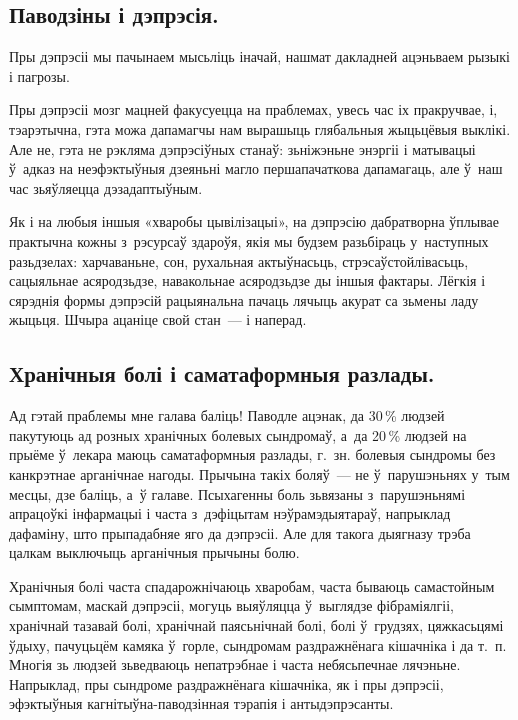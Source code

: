 \subsection*{Паводзіны і дэпрэсія.}

Пры дэпрэсіі мы пачынаем мысьліць іначай, нашмат дакладней ацэньваем рызыкі і пагрозы. 


Пры дэпрэсіі мозг мацней факусуецца на праблемах, увесь час іх пракручвае, і, тэарэтычна, гэта можа дапамагчы нам вырашыць глябальныя жыцьцёвыя выклікі. Але не, гэта не рэкляма дэпрэсіўных станаў: зьніжэньне энэргіі і матывацыі ў~адказ на неэфэктыўныя дзеяньні магло першапачаткова дапамагаць, але ў~наш час зьяўляецца дэзадаптыўным.

Як і на любыя іншыя «хваробы цывілізацыі», на дэпрэсію дабратворна ўплывае практычна кожны з~рэсурсаў здароўя, якія мы будзем разьбіраць у~наступных разьдзелах: харчаваньне, сон, рухальная актыўнасьць, стрэсаўстойлівасьць, сацыяльнае асяродзьдзе, навакольнае асяродзьдзе ды іншыя фактары. Лёгкія і сярэднія формы дэпрэсій рацыянальна пачаць лячыць акурат са зьмены ладу жыцьця. Шчыра ацаніце свой стан~--- і наперад.

\subsection*{Хранічныя болі і саматаформныя разлады.}

Ад гэтай праблемы мне галава баліць! Паводле ацэнак, да 30\,\% людзей пакутуюць ад розных хранічных болевых сындромаў, а~да 20\,\% людзей на прыёме ў~лекара маюць саматаформныя разлады, г.~зн. болевыя сындромы без канкрэтнае арганічнае нагоды. Прычына такіх боляў~--- не ў~парушэньнях у~тым месцы, дзе баліць, а~ў галаве. Псыхагенны боль зьвязаны з~парушэньнямі апрацоўкі інфармацыі і часта з~дэфіцытам нэўрамэдыятараў, напрыклад дафаміну, што прыпадабняе яго да дэпрэсіі. Але для такога дыягназу трэба цалкам выключыць арганічныя прычыны болю.

Хранічныя болі часта спадарожнічаюць хваробам, часта бываюць самастойным сымптомам, маскай дэпрэсіі, могуць выяўляцца ў~выглядзе фібраміялгіі, хранічнай тазавай болі, хранічнай паясьнічнай болі, болі ў~грудзях, цяжкасьцямі ўдыху, пачуцьцём камяка ў~горле, сындромам раздражнёнага кішачніка і да т.~п. Многія зь людзей зьведваюць непатрэбнае і часта небясьпечнае лячэньне. Напрыклад, пры сындроме раздражнёнага кішачніка, як і пры дэпрэсіі, эфэктыўныя кагнітыўна-паводзінная тэрапія і антыдэпрэсанты.

